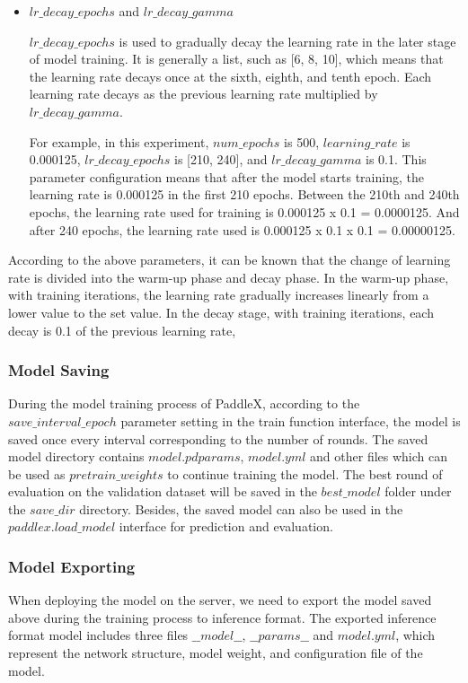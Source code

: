 \documentclass[sensors,article,submit,moreauthors,pdftex]{Definitions/mdpi}
\begin{document}
\begin{itemize}
\item{$lr\_decay\_epochs$} and {$lr\_decay\_gamma$}

$lr\_decay\_epochs$ is used to gradually decay the learning rate in the later stage of model training. It is generally a list, such as [6, 8, 10], which means that the learning rate decays once at the sixth, eighth, and tenth epoch. Each learning rate decays as the previous learning rate multiplied by $lr\_decay\_gamma$.

For example, in this experiment, $num\_epochs$ is 500, $learning\_rate$ is 0.000125, $lr\_decay\_epochs$ is [210, 240], and $lr\_decay\_gamma$ is 0.1. This parameter configuration means that after the model starts training, the learning rate is 0.000125 in the first 210 epochs. Between the 210th and 240th epochs, the learning rate used for training is 0.000125 x 0.1 = 0.0000125. And after 240 epochs, the learning rate used is 0.000125 x 0.1 x 0.1 = 0.00000125.

\end{itemize}

According to the above parameters, it can be known that the change of learning rate is divided into the warm-up phase and decay phase. In the warm-up phase, with training iterations, the learning rate gradually increases linearly from a lower value to the set value. In the decay stage, with training iterations, each decay is 0.1 of the previous learning rate,

\subsubsection{Model Saving}
During the model training process of PaddleX, according to the $save\_interval\_epoch$ parameter setting in the train function interface, the model is saved once every interval corresponding to the number of rounds. The saved model directory contains $model.pdparams$, $model.yml$ and other files which can be used as $pretrain\_weights$ to continue training the model. The best round of evaluation on the validation dataset will be saved in the $best\_model$ folder under the $save\_dir$ directory. Besides, the saved model can also be used in the $paddlex.load\_model$ interface for prediction and evaluation.



\subsubsection{Model Exporting}
When deploying the model on the server, we need to export the model saved above during the training process to inference format. The exported inference format model includes three files $\_\_model\_\_$, $\_\_params\_\_$ and $model.yml$, which represent the network structure, model weight, and configuration file of the model.
\end{document}

